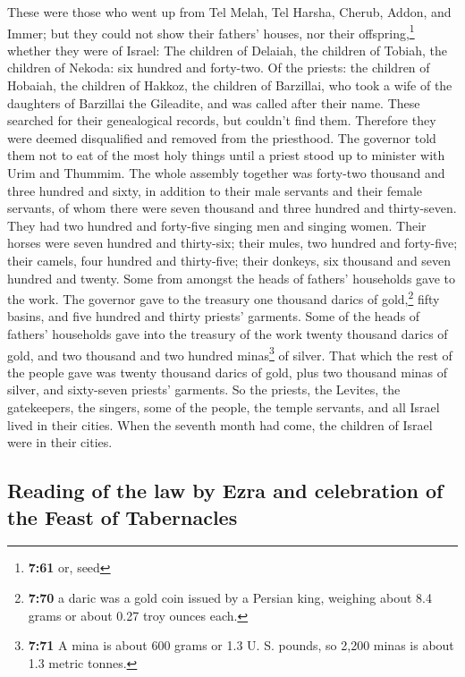  These were those who went up from Tel Melah, Tel Harsha,
Cherub, Addon, and Immer; but they could not show their fathers' houses,
nor their offspring,\footnote{\textbf{7:61} or, seed} whether they were
of Israel:  The children of Delaiah, the children of
Tobiah, the children of Nekoda: six hundred and forty-two.
 Of the priests: the children of Hobaiah, the children of
Hakkoz, the children of Barzillai, who took a wife of the daughters of
Barzillai the Gileadite, and was called after their name.
 These searched for their genealogical records, but
couldn't find them. Therefore they were deemed disqualified and removed
from the priesthood.  The governor told them not to eat
of the most holy things until a priest stood up to minister with Urim
and Thummim.  The whole assembly together was forty-two
thousand and three hundred and sixty,  in addition to
their male servants and their female servants, of whom there were seven
thousand and three hundred and thirty-seven. They had two hundred and
forty-five singing men and singing women.  Their horses
were seven hundred and thirty-six; their mules, two hundred and
forty-five;  their camels, four hundred and thirty-five;
their donkeys, six thousand and seven hundred and twenty.
 Some from amongst the heads of fathers' households gave
to the work. The governor gave to the treasury one thousand darics of
gold,\footnote{\textbf{7:70} a daric was a gold coin issued by a Persian
  king, weighing about 8.4 grams or about 0.27 troy ounces each.} fifty
basins, and five hundred and thirty priests' garments. 
Some of the heads of fathers' households gave into the treasury of the
work twenty thousand darics of gold, and two thousand and two hundred
minas\footnote{\textbf{7:71} A mina is about 600 grams or 1.3 U. S.
  pounds, so 2,200 minas is about 1.3 metric tonnes.} of silver.
 That which the rest of the people gave was twenty
thousand darics of gold, plus two thousand minas of silver, and
sixty-seven priests' garments.  So the priests, the
Levites, the gatekeepers, the singers, some of the people, the temple
servants, and all Israel lived in their cities. When the seventh month
had come, the children of Israel were in their cities.

\hypertarget{reading-of-the-law-by-ezra-and-celebration-of-the-feast-of-tabernacles}{%
\subsection{Reading of the law by Ezra and celebration of the Feast of
Tabernacles}\label{reading-of-the-law-by-ezra-and-celebration-of-the-feast-of-tabernacles}}

